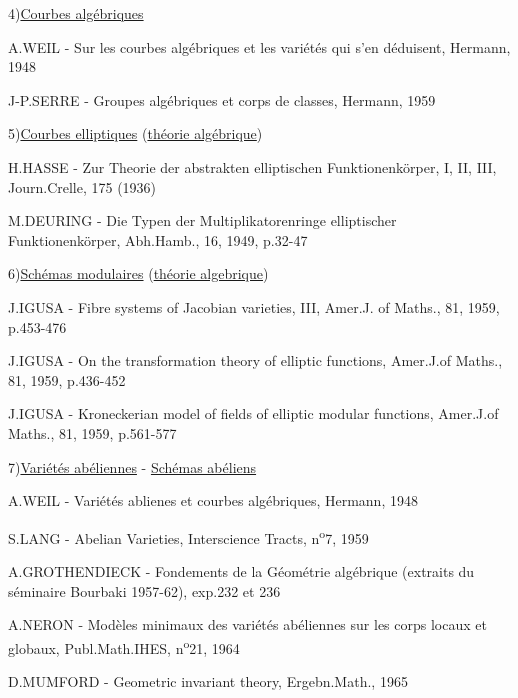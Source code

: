 \clearpage
{}
\reversemarginpar
{}
\normalmarginpar
{}

4)\quad \uline{Courbes algébriques}

\reversemarginpar
{}
A.WEIL - Sur \makebox[0pt][l]{\deleted{\unsure{-|=}}}les courbes algébriques et les variétés qui s'en déduisent, Hermann, 1948

J-P.SERRE - Groupes algébriques et corps de classes, Hermann, 1959

5)\quad \uline{Courbes elliptiques} (\uline{théorie algébrique})

H.HASSE - Zur Theorie der abstrakten elliptischen Funktionenkörper, I, II, III, Journ.Crelle, 175 (1936)

M.DEURING - Die Typen der Multiplikatorenringe elliptischer Funktionenkörper, Abh.Hamb., 16, 1949, p.32-47

6)\quad \uline{Schémas modulaires} (\uline{théorie algebrique})

J.IGUSA - Fibre systems of Jacobian varieties, III, Amer.J. of Maths., 81, 1959, p.453-476

J.IGUSA - On the transformation theory of elliptic functions, Amer.J.of Maths., 81, 1959, p.436-452

J.IGUSA - Kroneckerian model of fields of elliptic modular functions, Amer.J.of Maths., 81, 1959, p.561-577

7)\quad \uline{Variétés abéliennes} - \uline{Schémas abéliens}

A.WEIL - Variétés ablienes et courbes algébriques, Hermann, 1948

S.LANG - Abelian Varieties, Interscience Tracts, n\textsuperscript{o}7, 1959

A.GROTHENDIECK - Fondements de la Géométrie algébrique (extraits du séminaire Bourbaki 1957-62), exp.232 et 236

A.NERON - Modèles minimaux des variétés abéliennes sur les corps locaux et globaux, Publ.Math.IHES, n\textsuperscript{o}21, 1964

D.MUMFORD - Geometric invariant theory, Ergebn.Math., 1965
\normalmarginpar
